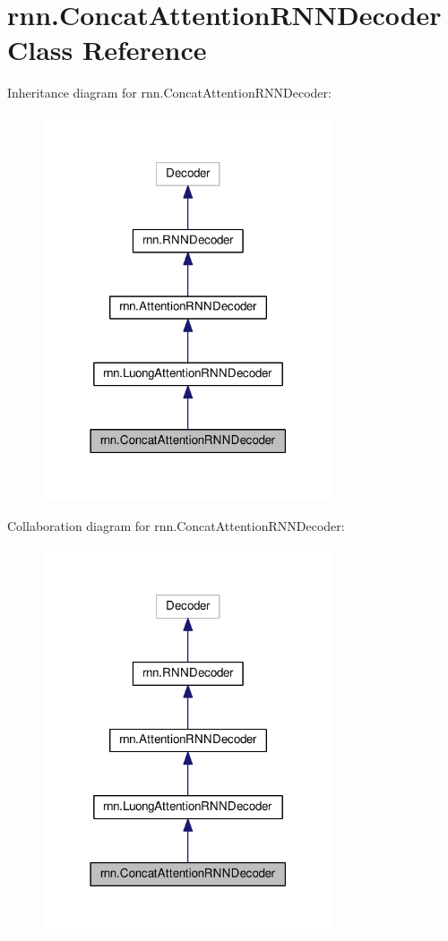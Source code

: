 \hypertarget{classrnn_1_1ConcatAttentionRNNDecoder}{}\section{rnn.\+Concat\+Attention\+R\+N\+N\+Decoder Class Reference}
\label{classrnn_1_1ConcatAttentionRNNDecoder}


Inheritance diagram for rnn.\+Concat\+Attention\+R\+N\+N\+Decoder\+:
\nopagebreak
\begin{figure}[H]
\begin{center}
\leavevmode
\includegraphics[width=243pt]{classrnn_1_1ConcatAttentionRNNDecoder__inherit__graph}
\end{center}
\end{figure}


Collaboration diagram for rnn.\+Concat\+Attention\+R\+N\+N\+Decoder\+:
\nopagebreak
\begin{figure}[H]
\begin{center}
\leavevmode
\includegraphics[width=243pt]{classrnn_1_1ConcatAttentionRNNDecoder__coll__graph}
\end{center}
\end{figure}
